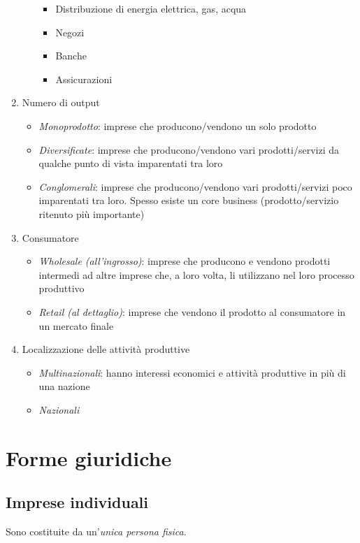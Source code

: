 \begin{enumerate}
\begin{itemize}
\begin{itemize}
            \item Distribuzione di energia elettrica, gas, acqua
            \item Negozi
            \item Banche
            \item Assicurazioni
        \end{itemize}
    \end{itemize}
    \item Numero di output
    \begin{itemize}
        \item \emph{Monoprodotto}: imprese che producono/vendono un solo prodotto
        \item \emph{Diversificate}: imprese che producono/vendono vari prodotti/servizi
        da qualche punto di vista imparentati tra loro
        \item \emph{Conglomerali}: imprese che producono/vendono vari prodotti/servizi
        poco imparentati tra loro. Spesso esiste un core business
        (prodotto/servizio ritenuto più importante)
    \end{itemize}
    \item Consumatore
    \begin{itemize}
        \item \emph{Wholesale (all’ingrosso)}: imprese che producono e vendono prodotti
        intermedi ad altre imprese che, a loro volta, li utilizzano nel loro processo
        produttivo
        \item \emph{Retail (al dettaglio)}: imprese che vendono il prodotto al consumatore in
        un mercato finale
    \end{itemize}
    \item Localizzazione delle attività produttive
    \begin{itemize}
        \item \emph{Multinazionali}: hanno interessi economici e attività produttive in più di
        una nazione
        \item \emph{Nazionali}
    \end{itemize}
\end{enumerate}

\section{Forme giuridiche}

\subsection{Imprese individuali}
Sono costituite da un'\emph{unica persona fisica}.


